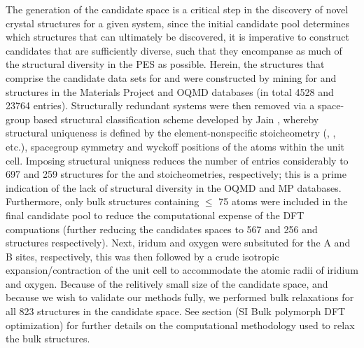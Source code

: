 %
The generation of the candidate space is a critical step in the discovery of novel crystal structures for a given system,
since the initial candidate pool determines which structures that can ultimately be discovered, it is imperative to construct candidates that are sufficiently diverse, such that they encompanse as much of the structural diversity in the PES as possible.
%
Herein, the structures that comprise the candidate data sets for \IrOtwo and \IrOthree were constructed by mining for \ABtwo and \ABthree structures in the Materials Project\cite{Jain2013} and OQMD\cite{Kirklin2015} databases
(in total \num{4528} \ABtwo and \num{23764} \ABthree entries).
%
Structurally redundant systems were then removed via a space-group based structural classification scheme developed by Jain  \cite{Jain2018},
whereby structural uniqueness is defined by the element-nonspecific stoicheometry (\ABtwo, \ABthree, etc.), spacegroup symmetry and wyckoff positions of the atoms within the unit cell.
%
Imposing structural uniqness reduces the number of entries considerably to \num{697} and \num{259} structures for the \ABtwo and \ABthree stoicheometries, respectively;
this is a prime indication of the lack of structural diversity in the OQMD and MP databases.
%
Furthermore, only bulk structures containing $\leq$ \num{75} atoms were included in the final candidate pool to reduce the computational expense of the DFT compuations
(further reducing the candidates spaces to \num{567} and \num{256} \ABtwo and \ABthree structures respectively).
%
Next, iridum and oxygen were subsituted for the A and B sites, respectively,
this was then followed by a crude isotropic expansion/contraction of the unit cell to accommodate the atomic radii of iridium and oxygen.
%
Because of the relitively small size of the candidate space, and because we wish to validate our methods fully, we performed bulk relaxations for all \num{823} structures in the candidate space.
%
See section (SI Bulk polymorph DFT optimization) for further details on the computational methodology used to relax the bulk structures.
